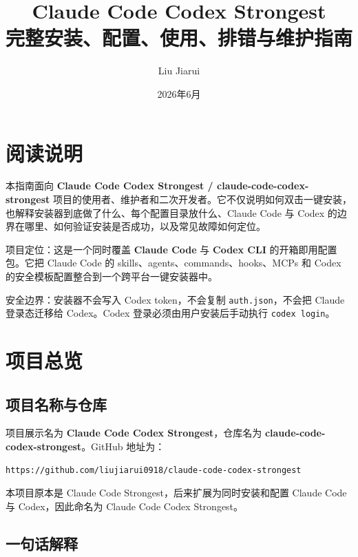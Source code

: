 \documentclass[11pt,a4paper]{ctexbook}
\title{\Huge Claude Code Codex Strongest\\[0.4em]\Large 完整安装、配置、使用、排错与维护指南}
\author{Liu Jiarui}
\date{2026年6月}
\begin{document}
\frontmatter
\maketitle
\tableofcontents

\chapter*{阅读说明}

本指南面向 \textbf{Claude Code Codex Strongest / claude-code-codex-strongest} 项目的使用者、维护者和二次开发者。它不仅说明如何双击一键安装，也解释安装器到底做了什么、每个配置目录放什么、Claude Code 与 Codex 的边界在哪里、如何验证安装是否成功，以及常见故障如何定位。

\begin{infobox}
项目定位：这是一个同时覆盖 \textbf{Claude Code} 与 \textbf{Codex CLI} 的开箱即用配置包。它把 Claude Code 的 skills、agents、commands、hooks、MCPs 和 Codex 的安全模板配置整合到一个跨平台一键安装器中。
\end{infobox}

\begin{warnbox}
安全边界：安装器不会写入 Codex token，不会复制 \texttt{auth.json}，不会把 Claude 登录态迁移给 Codex。Codex 登录必须由用户安装后手动执行 \texttt{codex login}。
\end{warnbox}

\mainmatter

\chapter{项目总览}

\section{项目名称与仓库}

项目展示名为 \textbf{Claude Code Codex Strongest}，仓库名为 \textbf{claude-code-codex-strongest}。GitHub 地址为：

\begin{lstlisting}
https://github.com/liujiarui0918/claude-code-codex-strongest
\end{lstlisting}

本项目原本是 Claude Code Strongest，后来扩展为同时安装和配置 Claude Code 与 Codex，因此命名为 Claude Code Codex Strongest。

\section{一句话解释}
\end{document}

